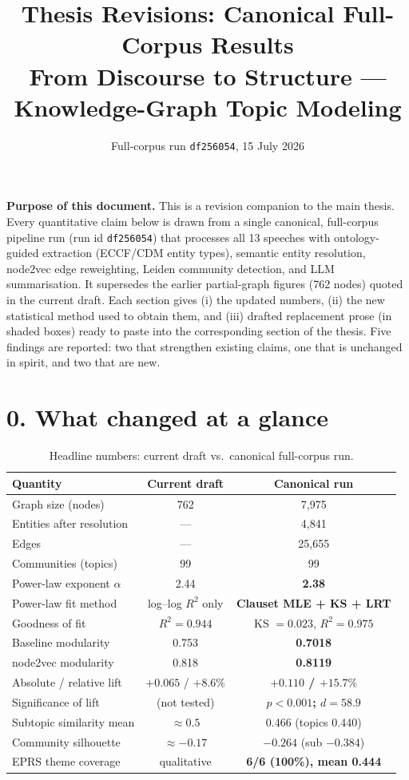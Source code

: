 \documentclass[11pt]{article}
\title{\textbf{Thesis Revisions: Canonical Full-Corpus Results}\\[4pt]
\large From Discourse to Structure --- Knowledge-Graph Topic Modeling}
\author{}
\date{Full-corpus run \texttt{df256054}, 15 July 2026}
\begin{document}
\maketitle

\begin{draftbox}
\textbf{Purpose of this document.} This is a revision companion to the main thesis. Every quantitative claim below is drawn from a single canonical, full-corpus pipeline run (run id \texttt{df256054}) that processes all 13 speeches with ontology-guided extraction (ECCF/CDM entity types), semantic entity resolution, node2vec edge reweighting, Leiden community detection, and LLM summarisation. It supersedes the earlier partial-graph figures (762 nodes) quoted in the current draft. Each section gives (i) the updated numbers, (ii) the new statistical method used to obtain them, and (iii) drafted replacement prose (in shaded boxes) ready to paste into the corresponding section of the thesis. Five findings are reported: two that strengthen existing claims, one that is unchanged in spirit, and two that are new.
\end{draftbox}

\section*{0. What changed at a glance}

\begin{table}[h]
\centering
\small
\caption{Headline numbers: current draft vs.\ canonical full-corpus run.}
\begin{tabular}{p{5.4cm}cc}
\toprule
\textbf{Quantity} & \textbf{Current draft} & \textbf{Canonical run} \\
\midrule
Graph size (nodes) & 762 & 7{,}975 \\
Entities after resolution & --- & 4{,}841 \\
Edges & --- & 25{,}655 \\
Communities (topics) & 99 & 99 \\
Power-law exponent $\alpha$ & 2.44 & \textbf{2.38} \\
Power-law fit method & log--log $R^2$ only & \textbf{Clauset MLE + KS + LRT} \\
Goodness of fit & $R^2=0.944$ & KS $=0.023$, $R^2=0.975$ \\
Baseline modularity & 0.753 & \textbf{0.7018} \\
node2vec modularity & 0.818 & \textbf{0.8119} \\
Absolute / relative lift & $+0.065$ / $+8.6\%$ & \textbf{$+0.110$ / $+15.7\%$} \\
Significance of lift & (not tested) & \textbf{$p<0.001$; $d=58.9$} \\
Subtopic similarity mean & $\approx 0.5$ & 0.466 (topics 0.440) \\
Community silhouette & $\approx -0.17$ & $-0.264$ (sub $-0.384$) \\
EPRS theme coverage & qualitative & \textbf{6/6 (100\%), mean 0.444} \\
\bottomrule
\end{tabular}
\end{table}
\end{document}

